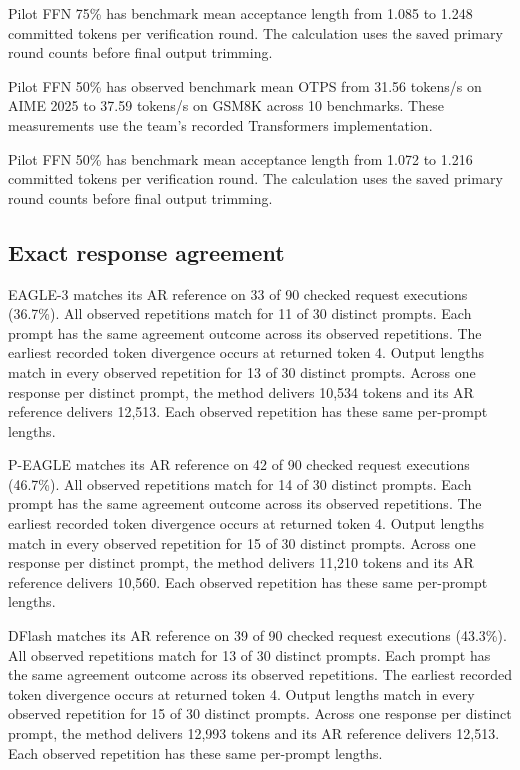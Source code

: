 \documentclass[conference,onecolumn]{IEEEtran}
\begin{document}
Pilot FFN 75\% has benchmark mean acceptance length from 1.085 to 1.248 committed tokens per verification round. The calculation uses the saved primary round counts before final output trimming.

Pilot FFN 50\% has observed benchmark mean OTPS from 31.56 tokens/s on AIME 2025 to 37.59 tokens/s on GSM8K across 10 benchmarks. These measurements use the team's recorded Transformers implementation.

Pilot FFN 50\% has benchmark mean acceptance length from 1.072 to 1.216 committed tokens per verification round. The calculation uses the saved primary round counts before final output trimming.

\subsection{Exact response agreement}

EAGLE-3 matches its AR reference on 33 of 90 checked request executions (36.7\%). All observed repetitions match for 11 of 30 distinct prompts. Each prompt has the same agreement outcome across its observed repetitions. The earliest recorded token divergence occurs at returned token 4. Output lengths match in every observed repetition for 13 of 30 distinct prompts. Across one response per distinct prompt, the method delivers 10,534 tokens and its AR reference delivers 12,513. Each observed repetition has these same per-prompt lengths.

P-EAGLE matches its AR reference on 42 of 90 checked request executions (46.7\%). All observed repetitions match for 14 of 30 distinct prompts. Each prompt has the same agreement outcome across its observed repetitions. The earliest recorded token divergence occurs at returned token 4. Output lengths match in every observed repetition for 15 of 30 distinct prompts. Across one response per distinct prompt, the method delivers 11,210 tokens and its AR reference delivers 10,560. Each observed repetition has these same per-prompt lengths.

DFlash matches its AR reference on 39 of 90 checked request executions (43.3\%). All observed repetitions match for 13 of 30 distinct prompts. Each prompt has the same agreement outcome across its observed repetitions. The earliest recorded token divergence occurs at returned token 4. Output lengths match in every observed repetition for 15 of 30 distinct prompts. Across one response per distinct prompt, the method delivers 12,993 tokens and its AR reference delivers 12,513. Each observed repetition has these same per-prompt lengths.
\end{document}

